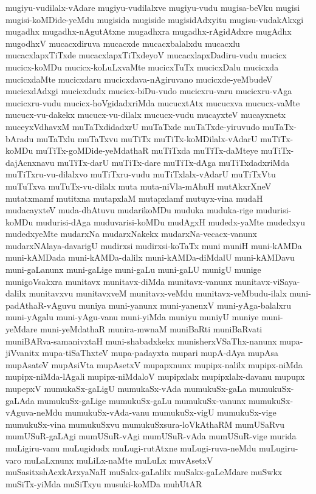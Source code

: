 {mugiyu-vudilalx-vAdare
mugiyu-vudilalxve
mugiyu-vudu
mugisa-beVku
mugisi
mugisi-koMDide-yeMdu
mugisida
mugiside
mugisidAdxyitu
mugisu-vudakAkxgi
mugadhx
mugadhx-nAgutAtxne
mugadhxra
mugadhx-rAgidAdxre
mugAdhx
mugodhxV
mucacxdiruva
mucacxde
mucacxbalalxdu
mucacxlu
mucacxlapxTiTxde
mucacxlapxTiTxdeyoV
mucacxlapxDadiru-vudu
mucicx
mucicx-koMDu
mucicx-koLuLxvaMte
mucicxTuTx
mucicxDalu
mucicxda
mucicxdaMte
mucicxdaru
mucicxdava-nAgiruvano
mucicxde-yeMbudeV
mucicxdAdxgi
mucicxdudx
mucicx-biDu-vudo
mucicxru-varu
mucicxru-vAga
mucicxru-vudu
mucicx-hoVgidadxriMda
mucucxtAtx
mucucxva
mucucx-vaMte
mucucx-vu-dakekx
mucucx-vu-dilalx
mucucx-vudu
mucayxteV
mucayxnetx
muceyxVdhavxM
muTaTxdidadxrU
muTaTxde
muTaTxde-yiruvudo
muTaTx-bAradu
muTaTxlu
muTaTxvu
muTiTx
muTiTx-koMDilalx-vAdarU
muTiTx-koMDu
muTiTx-goMDide-yeMdathaR
muTiTxda
muTiTx-daMteye
muTiTx-dajAcnxnavu
muTiTx-darU
muTiTx-dare
muTiTx-dAga
muTiTxdadxriMda
muTiTxru-vu-dilalxvo
muTiTxru-vudu
muTiTxlalx-vAdarU
muTiTxVtu
muTuTxva
muTuTx-vu-dilalx
muta
muta-niVla-mAhuH
mutAkxrXneV
mutatxmamf
mutitxna
mutapxlaM
mutapxlamf
mutuyx-vina
mudaH
mudacayxteV
muda-dhAtuvu
mudarikoMDu
muduka
muduka-rige
mudurisi-koMDu
mudurisi-dAga
muduvarisi-koMDu
mudAgxH
mudedx-yaMte
mudedxyu
mudedxyeMte
mudarxNa
mudarxNakekx
mudarxNa-vecacx-vanunx
mudarxNAlaya-davarigU
mudirxsi
mudirxsi-koTaTx
muni
muniH
muni-kAMDa
muni-kAMDada
muni-kAMDa-dalilx
muni-kAMDa-diMdalU
muni-kAMDavu
muni-gaLanunx
muni-gaLige
muni-gaLu
muni-gaLU
munigU
munige
munigoVsakxra
munitavx
munitavx-diMda
munitavx-vanunx
munitavx-viSaya-dalilx
munitavxvu
munitavxveM
munitavx-veMdu
munitavx-veMbudu-ilalx
muni-padAthaR-vAguvu
muniya
muni-yanunx
muni-yanenxV
muni-yAga-balalxru
muni-yAgalu
muni-yAgu-vanu
muni-yiMda
muniyu
muniyU
muniye
muni-yeMdare
muni-yeMdathaR
munira-mwnaM
muniBaRti
muniBaRvati
muniBARva-samanivxtaH
muni-shabadxkekx
munisherxVSaThx-nanunx
mupa-jiVvanitx
mupa-tiSaThxteV
mupa-padayxta
mupari
mupA-dAya
mupAsa
mupAsateV
mupAsiVta
mupAsetxV
mupapxnunx
mupipx-nalilx
mupipx-niMda
mupipx-niMda-lAgali
mupipx-niMdaloV
mupipxlalx
mupipxlalx-davanu
mupupx
mupepxV
mumukaSx-gaLigU
mumukaSx-vAda
mumukuSx-gaLa
mumukuSx-gaLAda
mumukuSx-gaLige
mumukuSx-gaLu
mumukuSx-vanunx
mumukuSx-vAguva-neMdu
mumukuSx-vAda-vanu
mumukuSx-vigU
mumukuSx-vige
mumukuSx-vina
mumukuSxvu
mumukuSxsura-loVkAthaRM
mumUSaRvu
mumUSuR-gaLAgi
mumUSuR-vAgi
mumUSuR-vAda
mumUSuR-vige
murida
muLigiru-vanu
muLugidudx
muLugi-rutAtxne
muLugi-ruva-neMdu
muLugiru-varo
muLaLxnunx
muLiLx-naMte
muLuLx
muvAsetxV
muSasitxshAcxkArxyaNaH
muSakx-gaLalilx
muSakx-gaLeMdare
muSwkx
muSiTx-yiMda
muSiTxyu
musuki-koMDa
muhUtAR
}
